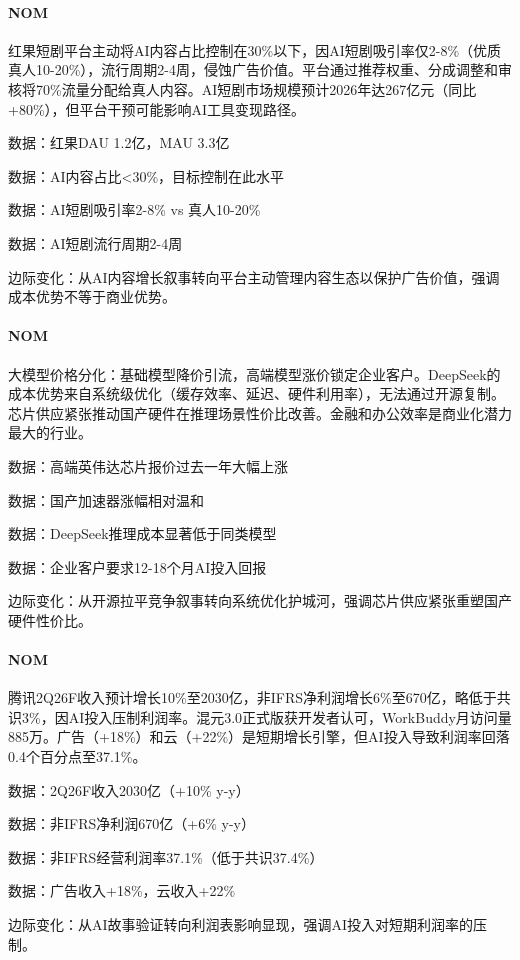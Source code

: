 \documentclass[11pt]{ctexart}
\begin{document}
\paragraph{NOM} 红果短剧平台主动将AI内容占比控制在30\%以下，因AI短剧吸引率仅2-8\%（优质真人10-20\%），流行周期2-4周，侵蚀广告价值。平台通过推荐权重、分成调整和审核将70\%流量分配给真人内容。AI短剧市场规模预计2026年达267亿元（同比+80\%），但平台干预可能影响AI工具变现路径。
{\small\color{refgray}数据：红果DAU 1.2亿，MAU 3.3亿\par}
{\small\color{refgray}数据：AI内容占比<30\%，目标控制在此水平\par}
{\small\color{refgray}数据：AI短剧吸引率2-8\% vs 真人10-20\%\par}
{\small\color{refgray}数据：AI短剧流行周期2-4周\par}
{\small\color{refgray}边际变化：从AI内容增长叙事转向平台主动管理内容生态以保护广告价值，强调成本优势不等于商业优势。\par}
\paragraph{NOM} 大模型价格分化：基础模型降价引流，高端模型涨价锁定企业客户。DeepSeek的成本优势来自系统级优化（缓存效率、延迟、硬件利用率），无法通过开源复制。芯片供应紧张推动国产硬件在推理场景性价比改善。金融和办公效率是商业化潜力最大的行业。
{\small\color{refgray}数据：高端英伟达芯片报价过去一年大幅上涨\par}
{\small\color{refgray}数据：国产加速器涨幅相对温和\par}
{\small\color{refgray}数据：DeepSeek推理成本显著低于同类模型\par}
{\small\color{refgray}数据：企业客户要求12-18个月AI投入回报\par}
{\small\color{refgray}边际变化：从开源拉平竞争叙事转向系统优化护城河，强调芯片供应紧张重塑国产硬件性价比。\par}
\paragraph{NOM} 腾讯2Q26F收入预计增长10\%至2030亿，非IFRS净利润增长6\%至670亿，略低于共识3\%，因AI投入压制利润率。混元3.0正式版获开发者认可，WorkBuddy月访问量885万。广告（+18\%）和云（+22\%）是短期增长引擎，但AI投入导致利润率回落0.4个百分点至37.1\%。
{\small\color{refgray}数据：2Q26F收入2030亿（+10\% y-y）\par}
{\small\color{refgray}数据：非IFRS净利润670亿（+6\% y-y）\par}
{\small\color{refgray}数据：非IFRS经营利润率37.1\%（低于共识37.4\%）\par}
{\small\color{refgray}数据：广告收入+18\%，云收入+22\%\par}
{\small\color{refgray}边际变化：从AI故事验证转向利润表影响显现，强调AI投入对短期利润率的压制。\par}
\end{document}
